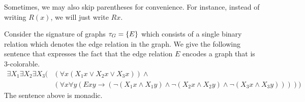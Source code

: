 \documentclass[11pt,twoside=off,numbers=noenddot]{scrbook}
\begin{document}
\begin{abuse}
  Sometimes, we may also skip parentheses for convenience. For
  instance, instead of writing $R(x)$, we will just write $R x$.
\end{abuse}

\begin{example}
  Consider the signature of graphs $\tau_G = \{ E \}$ which consists
  of a single binary relation which denotes the edge relation in the
  graph. We give the following sentence that expresses the fact that
  the edge relation $E$ encodes a graph that is 3-colorable.
  \begin{align*}
    \exists X_1 \exists X_2 \exists X_3 ( & (\forall x (X_1 x \vee
      X_2 x \vee X_3 x)) \wedge \\
      & (\forall x \forall y (E x y \rightarrow (\neg (X_1 x \wedge X_1
    y) \wedge \neg (X_2 x \wedge X_2 y) \wedge \neg (X_3 x \wedge X_3 y)))))
  \end{align*}
  The sentence above is monadic.
\end{example}
\end{document}
